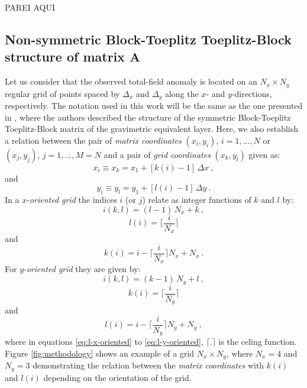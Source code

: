 PAREI AQUI

\subsection{Non-symmetric Block-Toeplitz Toeplitz-Block structure of matrix $\mathbf{A}$}

Let us consider that the observed total-field anomaly is located on an $N_x \times N_y$ regular grid of points spaced by $\Delta_x$ and $\Delta_y$ along the $x$- and $y$-directions, respectively.
The notation used in this work will be the same as the one presented in \cite{takahashi2020convolutional}, where the authors described the structure of the symmetric Block-Toeplitz Toeplitz-Block matrix of the gravimetric equivalent layer. Here, we also establish a relation between the pair of \emph{matrix coordinates} $(x_i, y_i)$, $i = 1, ..., N$ or $(x_j, y_j)$, $j = 1, ..., M = N $ and a pair of \emph{grid coordinates} $(x_k, y_l)$ given as:
\begin{equation}
x_{i} \equiv x_{k} = x_{1} + \left[ k(i) - 1 \right] \, \Delta x \: , 
\label{eq:xi}
\end{equation}
and
\begin{equation}
y_{i} \equiv y_{l} = y_{1} + \left[ l(i) - 1 \right] \, \Delta y \: .
\label{eq:yi}
\end{equation}
In a $x$-\textit{oriented grid} the indices $i$ (or $j$) relate as integer functions of $k$ and $l$ by:
\begin{equation}
i(k, l) = (l - 1) \, N_{x} + k \: ,
\label{eq:i-x-oriented}
\end{equation}
\begin{equation}
l(i) = \Bigg\lceil \frac{i}{N_{x}} \Bigg\rceil
\label{eq:l-x-oriented}
\end{equation}
and
\begin{equation}
k(i)  = i - \Bigg\lceil \frac{i}{N_{x}} \Bigg\rceil N_{x} + N_{x} \: .
\label{eq:k-x-oriented}
\end{equation}
For  $y$-\textit{oriented grid} they are given by:
\begin{equation}
i(k, l) = (k - 1) \, N_{y} + l \: ,
\label{eq:i-y-oriented}
\end{equation}
\begin{equation}
k(i) = \Bigg\lceil \frac{i}{N_{y}} \Bigg\rceil
\label{eq:k-y-oriented}
\end{equation}
and
\begin{equation}
l(i) = i - \Bigg\lceil \frac{i}{N_{y}} \Bigg\rceil N_{y} + N_{y} \: ,
\label{eq:l-y-oriented}
\end{equation}
where in equations \ref{eq:l-x-oriented} to \ref{eq:l-y-oriented}, $\lceil .\rceil$ is the celing function.
Figure \ref{fig:methodology} shows an example of a grid $N_{x} \times N_{y}$, where $N_{x} = 4$ and $N_{y} = 3$ demonstrating the relation between the \emph{matrix coordinates} with $k(i)$ and $l(i)$ depending on the orientation of the grid.

